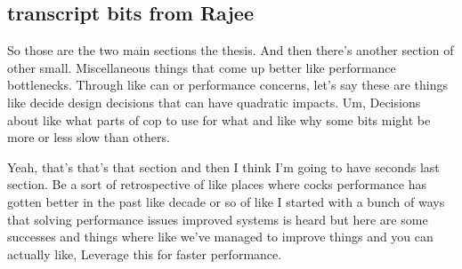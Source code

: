 \begin{subappendices}
\section{transcript bits from Rajee}
So those are the two main sections the thesis. And then there's another section of other small. Miscellaneous things that come up better like performance bottlenecks. Through like can or performance concerns, let's say these are things like decide design decisions that can have quadratic impacts. Um, Decisions about like what parts of cop to use for what and like why some bits might be more or less slow than others.

Yeah, that's that's that section and then I think I'm going to have seconds last section. Be a sort of retrospective of like places where cocks performance has gotten better in the past like decade or so of like I started with a bunch of ways that solving performance issues improved systems is heard but here are some successes and things where like we've managed to improve things and you can actually like, Leverage this for faster performance.


\end{subappendices}
